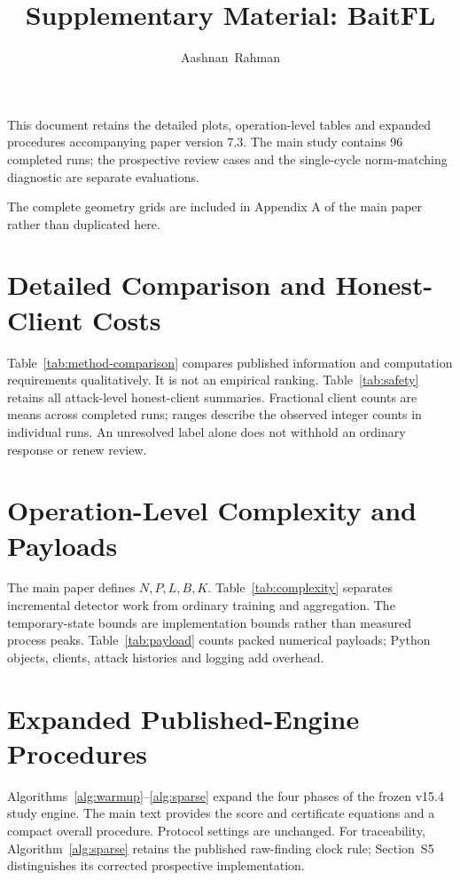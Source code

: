 \documentclass[journal]{IEEEtran}
\title{Supplementary Material: BaitFL}
\author{Aashnan~Rahman}
\begin{document}
\maketitle\raggedbottom
This document retains the detailed plots, operation-level tables and
expanded procedures accompanying paper version 7.3. The main study
contains 96 completed runs; the prospective review cases and the
single-cycle norm-matching diagnostic are separate evaluations.

The complete geometry grids are included in Appendix A of the main
paper rather than duplicated here.

\setcounter{section}{1}
\section{Detailed Comparison and Honest-Client Costs}
Table~\ref{tab:method-comparison} compares published information and
computation requirements qualitatively. It is not an empirical ranking.
Table~\ref{tab:safety} retains all attack-level honest-client summaries.
Fractional client counts are means across completed runs; ranges describe
the observed integer counts in individual runs. An unresolved label
alone does not withhold an ordinary response or renew review.


\FloatBarrier

\section{Operation-Level Complexity and Payloads}
The main paper defines $N,P,L,B,K$. Table~\ref{tab:complexity} separates
incremental detector work from ordinary training and aggregation.
The temporary-state bounds are implementation bounds rather than measured
process peaks. Table~\ref{tab:payload} counts packed numerical payloads;
Python objects, clients, attack histories and logging add overhead.


\FloatBarrier

\section{Expanded Published-Engine Procedures}
Algorithms~\ref{alg:warmup}--\ref{alg:sparse} expand the four phases
of the frozen v15.4 study engine. The main text provides the score and
certificate equations and a compact overall procedure. Protocol settings
are unchanged. For traceability, Algorithm~\ref{alg:sparse} retains the
published raw-finding clock rule; Section~S5 distinguishes its corrected
prospective implementation.

\FloatBarrier
\end{document}
